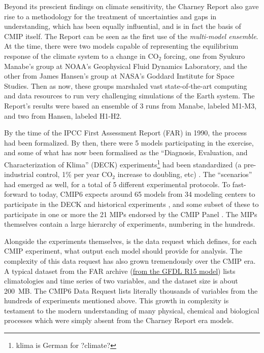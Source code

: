 \documentclass[gmd,manuscript]{copernicus}
\begin{document}
Beyond its prescient findings on climate sensitivity, the Charney
Report also gave rise to a methodology for the treatment of
uncertainties and gaps in understanding, which has been equally
influential, and is in fact the basis of CMIP itself. The Report can
be seen as the first use of the \emph{multi-model ensemble}. At the
time, there were two models capable of representing the equilibrium
response of the climate system to a change in CO$_2$ forcing, one from
Syukuro Manabe's group at NOAA's Geophysical Fluid Dynamics
Laboratory, and the other from James Hansen's group at NASA's Goddard
Institute for Space Studies. Then as now, these groups marshaled vast
state-of-the-art computing and data resources to run very challenging
simulations of the Earth system. The Report's results were based an
ensemble of 3 runs from Manabe, labeled M1-M3, and two from Hansen,
labeled H1-H2.

By the time of the IPCC First Assessment Report (FAR) in 1990, the
process had been formalized. By then, there were 5 models
participating in the exercise, and some of 
what has now been formalised as the ``Diagnosis, Evaluation, and Characterization of Klima''
(DECK) experiments\footnote{klima is German for ?climate?}
 had been standardized (a pre-industrial control, 1\% per year CO$_2$ increase
to doubling, etc) . The ``scenarios'' had emerged
as well, for a total of 5 different experimental protocols. To
fast-forward to today, CMIP6 expects around 65 models from 34 modeling
centers \citep[in 14 countries, in stark contrast to the US monopoly
in][]{ref:charneyetal1979} to participate in the DECK and historical
experiments \citep[Table~2 of][]{ref:eyringetal2016a}, and some subset
of these to participate in one or more the 21 MIPs endorsed by the
CMIP Panel \citep[Table~3 of][]{ref:eyringetal2016a}. The MIPs
themselves contain a large hierarchy of experiments, numbering in the
hundreds.

Alongside the experiments themselves, is the data request which
defines, for each CMIP experiment, what output each model should provide for analysis.
The complexity of this data request has also grown tremendously over the CMIP era.
A typical dataset from the FAR archive
(\href{https://goo.gl/M1WSJy}{from the GFDL R15 model}) lists
climatologies and time series of two variables, and the dataset size
is about 200~MB. The CMIP6 Data Request \citep[][replace with GMD
ref?]{ref:juckesetal2015} lists literally thousands of variables from
the hundreds of experiments mentioned above. This growth in complexity
is testament to the modern understanding of many physical, chemical and
biological processes which were simply absent from the Charney Report
era models.
\end{document}
